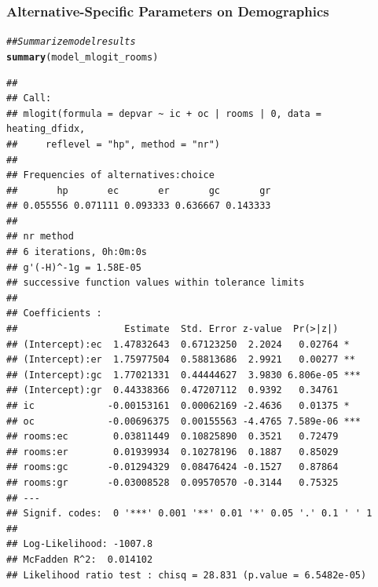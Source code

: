 \documentclass{beamer}\usepackage[]{graphicx}\usepackage[]{xcolor}
\makeatletter
\newcommand{\hlcom}[1]{\textcolor[rgb]{0.678,0.584,0.686}{\textit{#1}}}%
\newcommand{\hlstd}[1]{\textcolor[rgb]{0.345,0.345,0.345}{#1}}%
\newcommand{\hlkwd}[1]{\textcolor[rgb]{0.737,0.353,0.396}{\textbf{#1}}}%
\newenvironment{kframe}{%
 \def\at@end@of@kframe{}%
 \ifinner\ifhmode%
  \def\at@end@of@kframe{\end{minipage}}%
  \begin{minipage}{\columnwidth}%
 \fi\fi%
 \def\FrameCommand##1{\hskip\@totalleftmargin \hskip-\fboxsep
 \colorbox{shadecolor}{##1}\hskip-\fboxsep
     \hskip-\linewidth \hskip-\@totalleftmargin \hskip\columnwidth}%
 \MakeFramed {\advance\hsize-\width
   \@totalleftmargin\z@ \linewidth\hsize
   \@setminipage}}%
 {\par\unskip\endMakeFramed%
 \at@end@of@kframe}
\newenvironment{knitrout}{}{} %
\makeatother
\begin{document}
\begin{frame}[fragile]\frametitle{Alternative-Specific Parameters on Demographics}
    \vspace{1ex}
\begin{knitrout}\tiny
{}\color{fgcolor}\begin{kframe}
\begin{alltt}
\hlcom{## Summarize model results}
\hlkwd{summary}\hlstd{(model_mlogit_rooms)}
\end{alltt}
\begin{verbatim}
## 
## Call:
## mlogit(formula = depvar ~ ic + oc | rooms | 0, data = heating_dfidx, 
##     reflevel = "hp", method = "nr")
## 
## Frequencies of alternatives:choice
##       hp       ec       er       gc       gr 
## 0.055556 0.071111 0.093333 0.636667 0.143333 
## 
## nr method
## 6 iterations, 0h:0m:0s 
## g'(-H)^-1g = 1.58E-05 
## successive function values within tolerance limits 
## 
## Coefficients :
##                   Estimate  Std. Error z-value  Pr(>|z|)    
## (Intercept):ec  1.47832643  0.67123250  2.2024   0.02764 *  
## (Intercept):er  1.75977504  0.58813686  2.9921   0.00277 ** 
## (Intercept):gc  1.77021331  0.44444627  3.9830 6.806e-05 ***
## (Intercept):gr  0.44338366  0.47207112  0.9392   0.34761    
## ic             -0.00153161  0.00062169 -2.4636   0.01375 *  
## oc             -0.00696375  0.00155563 -4.4765 7.589e-06 ***
## rooms:ec        0.03811449  0.10825890  0.3521   0.72479    
## rooms:er        0.01939934  0.10278196  0.1887   0.85029    
## rooms:gc       -0.01294329  0.08476424 -0.1527   0.87864    
## rooms:gr       -0.03008528  0.09570570 -0.3144   0.75325    
## ---
## Signif. codes:  0 '***' 0.001 '**' 0.01 '*' 0.05 '.' 0.1 ' ' 1
## 
## Log-Likelihood: -1007.8
## McFadden R^2:  0.014102 
## Likelihood ratio test : chisq = 28.831 (p.value = 6.5482e-05)
\end{verbatim}
\end{kframe}
\end{knitrout}
\end{frame}
\end{document}

